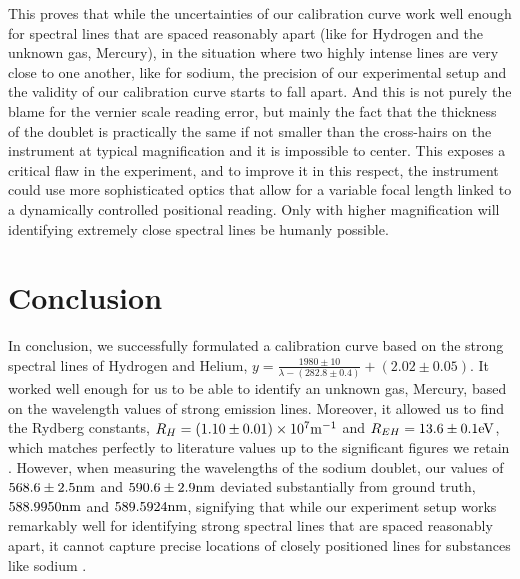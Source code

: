 \documentclass[12pt]{article}
\begin{document}
This proves that while the uncertainties of our calibration curve work well enough for spectral lines that are spaced reasonably apart (like for Hydrogen and the unknown gas, Mercury), in the situation where two highly intense lines are very close to one another, like for sodium, the precision of our experimental setup and the validity of our calibration curve starts to fall apart. And this is not purely the blame for the vernier scale reading error, but mainly the fact that the thickness of the doublet is practically the same if not smaller than the cross-hairs on the instrument at typical magnification and it is impossible to center. This exposes a critical flaw in the experiment, and to improve it in this respect, the instrument could use more sophisticated optics that allow for a variable focal length linked to a dynamically controlled positional reading. Only with higher magnification will identifying extremely close spectral lines be humanly possible.

\section{Conclusion}
In conclusion, we successfully formulated a calibration curve based on the strong spectral lines of Hydrogen and Helium, $y=\frac{1980 \pm 10}{\lambda - (282.8 \pm 0.4)} + (2.02 \pm 0.05)$. It worked well enough for us to be able to identify an unknown gas, Mercury, based on the wavelength values of strong emission lines. Moreover, it allowed us to find the Rydberg constants, $R_{H} = (1.10 \pm 0.01) \times 10^7 {\rm m}^{-1}$ and $R_{EH} = 13.6 \pm 0.1 {\rm eV}$, which matches perfectly to literature values up to the significant figures we retain \autocite{PhysRevA.34.5138}. However, when measuring the wavelengths of the sodium doublet, our values of $568.6 \pm 2.5 {\rm nm}$ and $590.6 \pm 2.9 {\rm nm}$ deviated substantially from ground truth, $588.9950 {\rm nm}$ and $589.5924 {\rm nm}$, signifying that while our experiment setup works remarkably well for identifying strong spectral lines that are spaced reasonably apart, it cannot capture precise locations of closely positioned lines for substances like sodium \autocite{manuall}.
\end{document}
